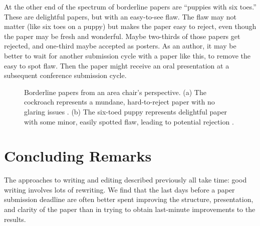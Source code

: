 At the other end of the spectrum of borderline papers are ``puppies with six toes.''  These are delightful papers, but with an easy-to-see flaw.  The flaw may not matter (like six toes on a puppy) but makes the paper easy to reject, even though the paper may be fresh and wonderful.  Maybe two-thirds of those papers get rejected, and one-third maybe accepted as posters.  As an author, it may be better to wait for another submission cycle with a paper like this, to remove the easy to spot flaw.  Then the paper might receive an oral presentation at a subsequent conference submission cycle.

\begin{figure}
\centerline{
}
\caption{Borderline papers from an area chair's perspective. (a) The cockroach represents a mundane, hard-to-reject paper with no glaring issues \cite{cockroach}. (b) The six-toed puppy represents delightful paper with some minor, easily spotted flaw, leading to potential rejection \cite{puppy}. }
\label{fig:areachair}
\end{figure}

\section{Concluding Remarks}
The approaches to writing and editing described previously all take time: 
 good writing involves lots of rewriting.  We find that the last days before a paper submission deadline are often better spent improving the structure, presentation, and clarity of the paper than in trying to obtain last-minute improvements to the results.
